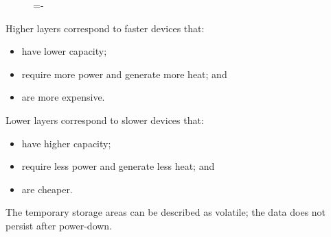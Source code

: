 \documentclass[a4paper]{systems-software}
\begin{document}
\begin{figure}[H]
  \lineskip=-\fboxrule
\end{figure}

Higher layers correspond to faster devices that:
\begin{itemize}
	\item have lower capacity;
	\item require more power and generate more heat; and
	\item are more expensive.
\end{itemize}

Lower layers correspond to slower devices that:
\begin{itemize}
	\item have higher capacity;
	\item require less power and generate less heat; and
	\item are cheaper.
\end{itemize}

The temporary storage areas can be described as volatile; the data does not persist after power-down.
\end{document}
